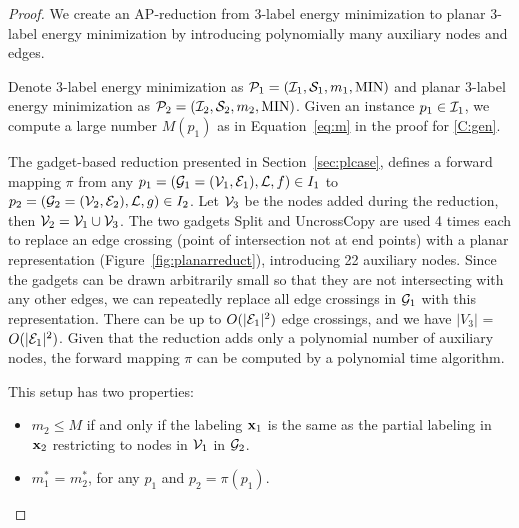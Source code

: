 \Tplanar*
\begin{proof}



We create an AP-reduction from 3-label energy minimization to planar 3-label energy minimization by introducing polynomially many auxiliary nodes and edges.

Denote 3-label energy minimization as $ \mathcal{P}_1 = (\mathcal{I}_1, \mathcal{S}_1, m_1, \text{MIN})$ and planar 3-label energy minimization as $\mathcal{P}_2 = (\mathcal{I}_2, \mathcal{S}_2, m_2, \text{MIN})$.
Given an instance $p_1 \in \mathcal{I}_1$, we compute a large number $M(p_1)$ as in Equation~\cref{eq:m} in the proof for \cref{C:gen}.

The gadget-based reduction presented in Section~\ref{sec:plcase}, defines a forward mapping $\pi$ from any $p_1 = (\mathcal{G}_1 = (\mathcal{V}_1, \mathcal{E}_1), \mathcal{L}, f) \in I_1$ to $p_2 = (\mathcal{G}_2 = (\mathcal{V}_2, \mathcal{E}_2), \mathcal{L}, g) \in I_2$. Let $\mathcal{V}_3$ be the nodes added during the reduction, then $\mathcal{V}_2 = \mathcal{V}_1 \cup \mathcal{V}_3$. The two gadgets {\sc Split} and {\sc UncrossCopy} are used 4 times each to replace an edge crossing (point of intersection not at end points) with a planar representation (Figure~\ref{fig:planarreduct}), introducing 22 auxiliary nodes. Since the gadgets can be drawn arbitrarily small so that they are not intersecting with any other edges, we can repeatedly replace all edge crossings in $\mathcal{G}_1$ with this representation. There can be up to $O(|\mathcal{E}_1|^2)$ edge crossings,
and we have $|V_3|$ = $O(|\mathcal{E}_1|^2)$.
Given that the reduction adds only a polynomial number of auxiliary nodes, the forward mapping $\pi$ can be computed by a polynomial time algorithm.

This setup has two properties:
\begin{itemize}
    \item $m_2 \leq M$ if and only if the labeling ${\bf x}_1$ is the same as the partial labeling in ${\bf x}_2$ restricting to nodes in $\mathcal{V}_1$ in $\mathcal{G}_2$.
    \item $m_1^*$ = $m_2^*$, for any $p_1$ and $p_2 = \pi(p_1)$.
\end{itemize}


\end{proof}
